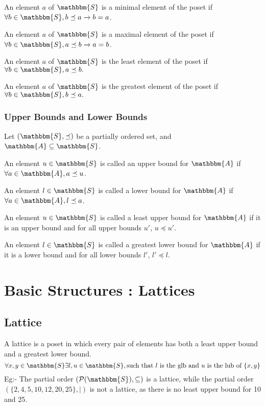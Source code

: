 \documentclass[14pt]{extarticle}
\newcommand{\impl}{\xrightarrow{}}
\newcommand{\A}{\mathbbm{A}}
\newcommand{\Sset}{\mathbbm{S}}
\newcommand{\powerset}{\mathcal{P}}
\newcommand{\pordereq}{\preceq}
\begin{document}
An element $a$ of $\Sset$ is a minimal element of the poset if $\forall b \in \Sset, b \pordereq a \impl b = a$.

An element $a$ of $\Sset$ is a maximal element of the poset if $\forall b \in \Sset, a \pordereq b \impl a = b$.

An element $a$ of $\Sset$ is the least element of the poset if $\forall b \in \Sset, a \pordereq b.$

An element $a$ of $\Sset$ is the greatest element of the poset if $\forall b \in \Sset, b \pordereq a.$

\subsubsection{Upper Bounds and Lower Bounds}

Let $(\Sset, \pordereq)$ be a partially ordered set, and $\A \subseteq \Sset$.

An element $u \in \Sset$ is called an upper bound for $\A$ if $\forall a \in \A, a \pordereq u$.

An element $l \in \Sset$ is called a lower bound for $\A$ if $\forall a \in \A, l \pordereq a$.

An element $u \in \Sset$ is called a least upper bound for $\A$ if it is an upper bound and for all upper bounds $u'$, $u \pordereq u'$.

An element $l \in \Sset$ is called a greatest lower bound for $\A$ if it is a lower bound and for all lower bounds $l'$, $l' \pordereq l$.

\section{Basic Structures : Lattices}

\subsection{Lattice}
A lattice is a poset in which every pair of elements has both a least upper bound and a greatest lower bound.
\[
    \forall x, y \in \Sset \exists l, u \in \Sset, \text{such that } l \text{ is the glb and } u \text{ is the lub of } \{x, y\}
\]
Eg:- The partial order $(\powerset(\Sset), \subseteq)$ is a lattice, while the partial order $(\{2, 4, 5, 10, 12, 20, 25\}, |)$ is not a lattice, as there is no least upper bound for 10 and 25.
\end{document}
